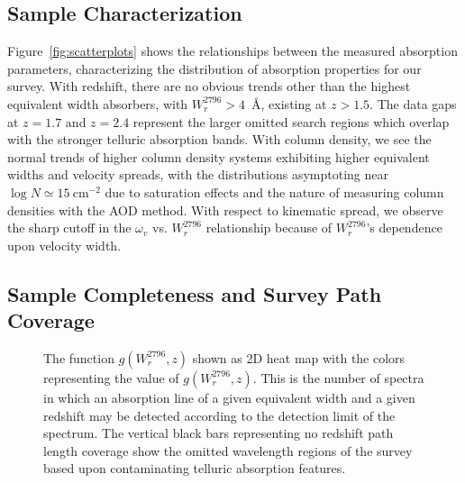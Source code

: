 \documentclass[iop,apj,numberedappendix,appendixfloats,twocolappendix]{emulateapj}
\begin{document}
\subsection{Sample Characterization}
\label{sec:sample}

\begin{figure*}[bth]
\caption{Correlations between measured absorption properties for survey sample. $\log N$ is the AOD column density, $\omega_v$ is the kinematic spread, $W_r^{2796}$ is the rest frame {} equivalent width, and $z$ is the absorption redshift.}
\label{fig:scatterplots}
\end{figure*}

Figure~\ref{fig:scatterplots} shows the relationships between the measured absorption parameters, characterizing the distribution of absorption properties for our survey. With redshift, there are no obvious trends other than the highest equivalent width absorbers, with $W_r^{2796} > 4$~{\AA}, existing at $z > 1.5$. The data gaps at $z = 1.7$ and $z = 2.4$ represent the larger omitted search regions which overlap with the stronger telluric absorption bands. With column density, we see the normal trends of higher column density systems exhibiting higher equivalent widths and velocity spreads, with the distributions asymptoting near $\log N \simeq 15~\mathrm{cm^{-2}}$ due to saturation effects and the nature of measuring column densities with the AOD method. With respect to kinematic spread, we observe the sharp cutoff in the $\omega_v$ vs. $W_r^{2796}$ relationship because of $W_r^{2796}$'s dependence upon velocity width. 

\subsection{Sample Completeness and Survey Path Coverage}

\begin{figure}[bth]
\caption{The function $g(W_r^{2796}, z)$ shown as 2D heat map with the colors representing the value of $g(W_r^{2796}, z)$. This is the number of spectra in which an absorption line of a given equivalent width and a given redshift may be detected according to the detection limit of the spectrum. The vertical black bars representing no redshift path length coverage show the omitted wavelength regions of the survey based upon contaminating telluric absorption features.}
\label{fig:gwz}
\end{figure}
\end{document}
